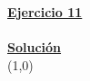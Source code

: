\indent\underline{\textbf{Ejercicio 11}}\\
\lipsum[4]\\

\indent\underline{\textbf{Solución}}\\

\line(1,0){\textwidth}
